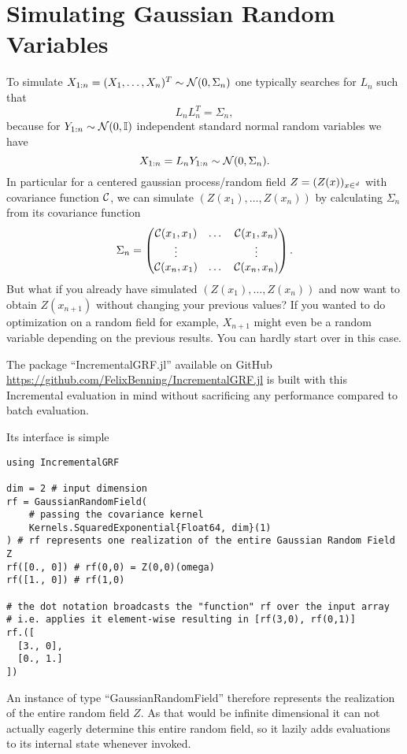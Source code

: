 \section{Simulating Gaussian Random Variables}

To simulate \(X_{1:n} = (X_1,\dots,X_n)^T \sim \mathcal{N}(0, \Sigma_n)\) one typically
searches for \(L_n\) such that
\[
	L_n L_n^T = \Sigma_n,
\]
because for \(Y_{1:n}\sim\mathcal{N}(0,\mathbb{I})\) independent standard normal
random variables we have
\[
	X_{1:n} = L_n Y_{1:n} \sim \mathcal{N}(0, \Sigma_n).
\]
In particular for a centered gaussian process/random field 
\(Z=(Z(x))_{x\in\real^\dimension}\) with covariance function \(\mathcal{C}\),
we can simulate \((Z(x_1),\dots, Z(x_n))\) by calculating \(\Sigma_n\) from its
covariance function
\[
	\Sigma_n = \begin{pmatrix}
		\mathcal{C}(x_1, x_1) &\dots &\mathcal{C}(x_1, x_n)\\
		\vdots &  & \vdots \\
		\mathcal{C}(x_n, x_1) &\dots &\mathcal{C}(x_n, x_n)
	\end{pmatrix}.
\]
But what if you already have simulated \((Z(x_1),\dots,Z(x_n))\) and now want
to obtain \(Z(x_{n+1})\) without changing your previous values? If you wanted
to do optimization on a random field for example, \(X_{n+1}\) might even be a
random variable depending on the previous results. You can hardly start over
in this case.

The package ``IncrementalGRF.jl'' available on GitHub
\url{https://github.com/FelixBenning/IncrementalGRF.jl} is built with this
Incremental evaluation in mind without sacrificing any performance compared to
batch evaluation.

Its interface is simple

\begin{verbatim}
using IncrementalGRF

dim = 2 # input dimension
rf = GaussianRandomField(
	# passing the covariance kernel
	Kernels.SquaredExponential{Float64, dim}(1)
) # rf represents one realization of the entire Gaussian Random Field Z
rf([0., 0]) # rf(0,0) = Z(0,0)(omega)
rf([1., 0]) # rf(1,0)

# the dot notation broadcasts the "function" rf over the input array
# i.e. applies it element-wise resulting in [rf(3,0), rf(0,1)]
rf.([
  [3., 0],
  [0., 1.]
])
\end{verbatim}
An instance of type ``GaussianRandomField'' therefore represents the realization
of the entire random field \(Z\). As that would be infinite dimensional it can
not actually eagerly determine this entire random field, so it lazily
adds evaluations to its internal state whenever invoked.

